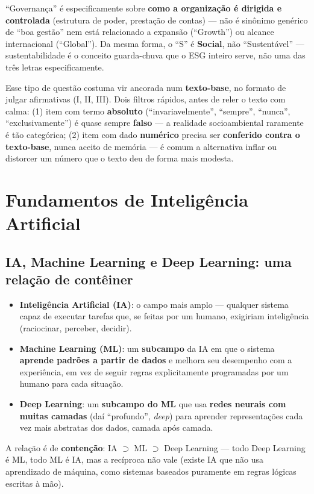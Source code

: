 \begin{cuidado}
“Governança” é especificamente sobre \textbf{como a organização é dirigida
e controlada} (estrutura de poder, prestação de contas) --- não é
sinônimo genérico de “boa gestão” nem está relacionado a expansão
(“Growth”) ou alcance internacional (“Global”). Da mesma forma, o “S” é
\textbf{Social}, não “Sustentável” --- sustentabilidade é o conceito
guarda-chuva que o ESG inteiro serve, não uma das três letras
especificamente.
\end{cuidado}

\begin{regrapratica}
Esse tipo de questão costuma vir ancorada num \textbf{texto-base}, no
formato de julgar afirmativas (I, II, III). Dois filtros rápidos, antes de
reler o texto com calma: (1) item com termo \textbf{absoluto}
(“invariavelmente”, “sempre”, “nunca”, “exclusivamente”) é quase sempre
\textbf{falso} --- a realidade socioambiental raramente é tão categórica;
(2) item com dado \textbf{numérico} precisa ser \textbf{conferido contra o
texto-base}, nunca aceito de memória --- é comum a alternativa inflar ou
distorcer um número que o texto deu de forma mais modesta.
\end{regrapratica}

\section{Fundamentos de Inteligência Artificial}

\subsection{IA, Machine Learning e Deep Learning: uma relação de contêiner}

\begin{conceito}
\begin{itemize}
\item \textbf{Inteligência Artificial (IA)}: o campo mais amplo ---
qualquer sistema capaz de executar tarefas que, se feitas por um humano,
exigiriam inteligência (raciocinar, perceber, decidir).
\item \textbf{Machine Learning (ML)}: um \textbf{subcampo} da IA em que o
sistema \textbf{aprende padrões a partir de dados} e melhora seu
desempenho com a experiência, em vez de seguir regras explicitamente
programadas por um humano para cada situação.
\item \textbf{Deep Learning}: um \textbf{subcampo do ML} que usa
\textbf{redes neurais com muitas camadas} (daí “profundo”,
\textit{deep}) para aprender representações cada vez mais abstratas dos
dados, camada após camada.
\end{itemize}
A relação é de \textbf{contenção}: IA $\supset$ ML $\supset$ Deep
Learning --- todo Deep Learning é ML, todo ML é IA, mas a recíproca não
vale (existe IA que não usa aprendizado de máquina, como sistemas
baseados puramente em regras lógicas escritas à mão).
\end{conceito}

